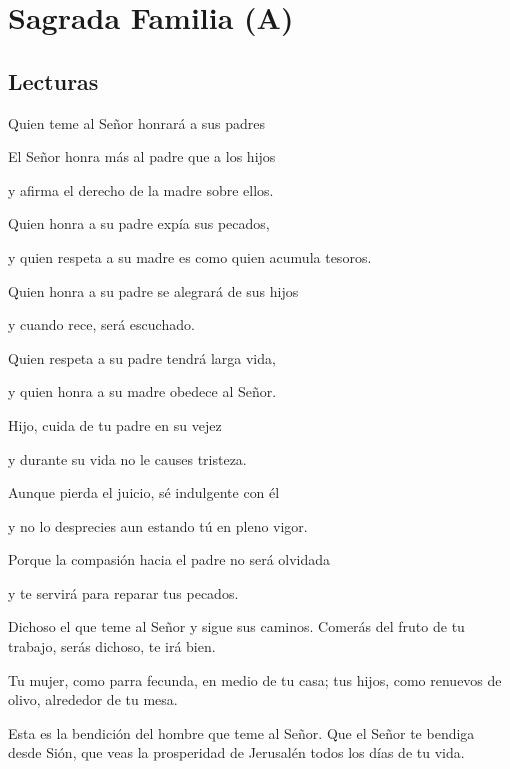 \chapter{Sagrada Familia (A)}

	\section{Lecturas}
	
		
		 
		
		\begin{scripture}
			
			\begin{readprose}
				Quien teme al Señor honrará a sus padres
				
				El Señor honra más al padre que a los hijos
				
				y afirma el derecho de la madre sobre ellos.
				
				Quien honra a su padre expía sus pecados,
				
				y quien respeta a su madre es como quien acumula tesoros.
				
				Quien honra a su padre se alegrará de sus hijos
				
				y cuando rece, será escuchado.
				
				Quien respeta a su padre tendrá larga vida,
				
				y quien honra a su madre obedece al Señor.
				
				Hijo, cuida de tu padre en su vejez
				
				y durante su vida no le causes tristeza.
				
				Aunque pierda el juicio, sé indulgente con él
				
				y no lo desprecies aun estando tú en pleno vigor.
				
				Porque la compasión hacia el padre no será olvidada
				
				y te servirá para reparar tus pecados.
			\end{readprose}
		\end{scripture}

		
		 
		
		
		\begin{psbody}
			Dichoso el que teme al Señor
			y sigue sus caminos.
			Comerás del fruto de tu trabajo,
			serás dichoso, te irá bien.
			
			Tu mujer, como parra fecunda,
			en medio de tu casa;
			tus hijos, como renuevos de olivo,
			alrededor de tu mesa.
			
			Esta es la bendición del hombre
			que teme al Señor.
			Que el Señor te bendiga desde Sión,
			que veas la prosperidad de Jerusalén
			todos los días de tu vida.
		\end{psbody}

